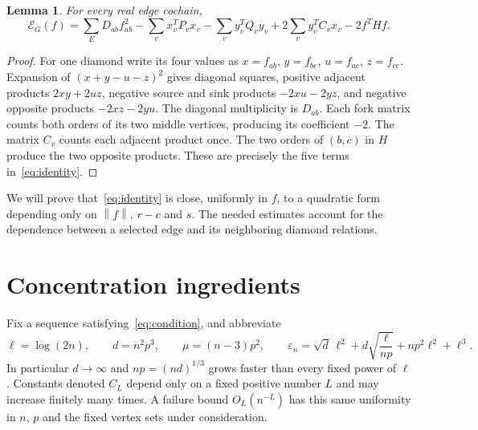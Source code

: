 \documentclass[11pt]{article}
\newtheorem{lemma}[theorem]{Lemma}
\theoremstyle{remark}
\newcommand{\norm}[1]{\left\lVert#1\right\rVert}
\begin{document}
\begin{lemma}\label{lem:identity}
For every real edge cochain,
\begin{equation}\label{eq:identity}
 \mathcal E_G(f)=\sum_E D_{ab}f_{ab}^2
  -\sum_v x_v^TP_vx_v-\sum_v y_v^TQ_vy_v
  +2\sum_v y_v^TC_vx_v-2f^THf.
\end{equation}
\end{lemma}
\begin{proof}
For one diamond write its four values as $x=f_{ab}$, $y=f_{be}$,
$u=f_{ac}$, $z=f_{ce}$. Expansion of $(x+y-u-z)^2$ gives diagonal
squares, positive adjacent products $2xy+2uz$, negative source and sink
products $-2xu-2yz$, and negative opposite products $-2xz-2yu$.
The diagonal multiplicity is $D_{ab}$. Each fork matrix counts both orders
of its two middle vertices, producing its coefficient $-2$.
The matrix $C_v$ counts each adjacent product once. The two orders of
$(b,c)$ in $H$ produce the two opposite products. These are precisely
the five terms in~\eqref{eq:identity}.
\end{proof}

We will prove that~\eqref{eq:identity} is close, uniformly in $f$, to a
quadratic form depending only on $\norm f$, $r-c$ and $s$.
The needed estimates account for the dependence between a selected edge
and its neighboring diamond relations.

\section{Concentration ingredients}

Fix a sequence satisfying~\eqref{eq:condition}, and abbreviate
\begin{equation}\label{eq:scales}
 \ell=\log(2n),\qquad d=n^2p^3,\qquad \mu=(n-3)p^2,
 \qquad
 \varepsilon_n=\sqrt d\,\ell^2
     +d\sqrt{\frac{\ell}{np}}+np^2\ell^2+\ell^3.
\end{equation}
In particular $d\to\infty$ and $np=(nd)^{1/3}$ grows faster than every
fixed power of $\ell$. Constants denoted $C_L$ depend only on a fixed
positive number $L$ and may increase finitely many times. A failure bound
$O_L(n^{-L})$ has this same uniformity in $n$, $p$ and the fixed vertex
sets under consideration.
\end{document}
